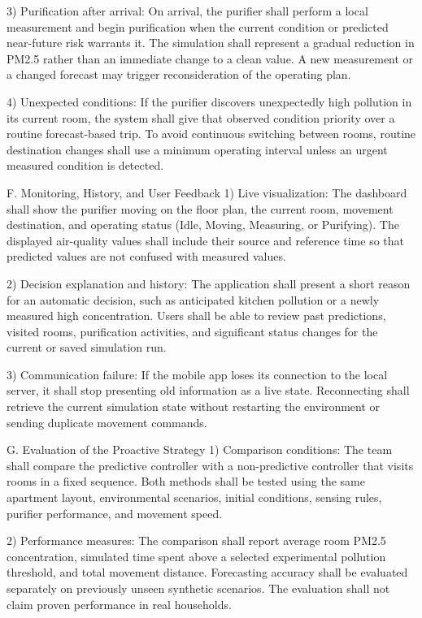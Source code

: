 3) Purification after arrival:
On arrival, the purifier shall perform a local measurement and begin purification when the current condition or predicted near-future risk warrants it. The simulation shall represent a gradual reduction in PM2.5 rather than an immediate change to a clean value. A new measurement or a changed forecast may trigger reconsideration of the operating plan.

4) Unexpected conditions:
If the purifier discovers unexpectedly high pollution in its current room, the system shall give that observed condition priority over a routine forecast-based trip. To avoid continuous switching between rooms, routine destination changes shall use a minimum operating interval unless an urgent measured condition is detected.

F. Monitoring, History, and User Feedback
1) Live visualization:
The dashboard shall show the purifier moving on the floor plan, the current room, movement destination, and operating status (Idle, Moving, Measuring, or Purifying). The displayed air-quality values shall include their source and reference time so that predicted values are not confused with measured values.

2) Decision explanation and history:
The application shall present a short reason for an automatic decision, such as anticipated kitchen pollution or a newly measured high concentration. Users shall be able to review past predictions, visited rooms, purification activities, and significant status changes for the current or saved simulation run.

3) Communication failure:
If the mobile app loses its connection to the local server, it shall stop presenting old information as a live state. Reconnecting shall retrieve the current simulation state without restarting the environment or sending duplicate movement commands.

G. Evaluation of the Proactive Strategy
1) Comparison conditions:
The team shall compare the predictive controller with a non-predictive controller that visits rooms in a fixed sequence. Both methods shall be tested using the same apartment layout, environmental scenarios, initial conditions, sensing rules, purifier performance, and movement speed.

2) Performance measures:
The comparison shall report average room PM2.5 concentration, simulated time spent above a selected experimental pollution threshold, and total movement distance. Forecasting accuracy shall be evaluated separately on previously unseen synthetic scenarios. The evaluation shall not claim proven performance in real households.


